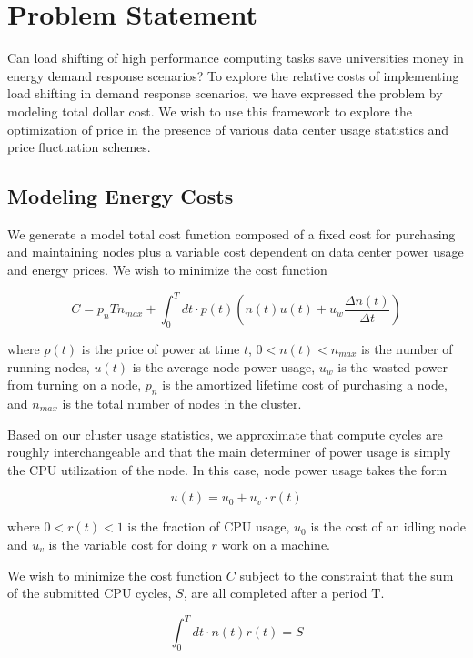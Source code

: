 \documentclass[letterpaper,twocolumn,10pt]{article}
\begin{document}
\section{Problem Statement}

Can load shifting of high performance computing tasks save universities money in energy demand response scenarios?  To explore the relative costs of implementing load shifting in demand response scenarios, we have expressed the problem by modeling total dollar cost.  We wish to use this framework to explore the optimization of price in the presence of various data center usage statistics and price fluctuation schemes.

\subsection{Modeling Energy Costs}

We generate a model total cost function composed of a fixed cost for purchasing and maintaining nodes plus a variable cost dependent on data center power usage and energy prices.  We wish to minimize the cost function

$$C = p_n T n_{max} + \int_0^T dt \cdot p(t)\left (n(t)u(t)+ u_w \frac{\Delta n(t) }{\Delta t} \right )  $$

where $p(t)$ is the price of power at time $t$, $0<n(t)<n_{max}$ is the number of running nodes, $u(t)$ is the average node power usage, $u_w$ is the wasted power from turning on a node, $p_n$ is the amortized lifetime cost of purchasing a node, and $n_{max}$ is the total number of nodes in the cluster.  

Based on our cluster usage statistics, we approximate that compute cycles are roughly interchangeable and that the main determiner of power usage is simply the CPU utilization of the node. In this case, node power usage takes the form

$$u(t) = u_0 + u_v \cdot r(t)$$

where $0<r(t)<1$ is the fraction of CPU usage, $u_0$ is the cost of an idling node and $u_v$ is the variable cost for doing $r$ work on a machine.

We wish to minimize the cost function $C$ subject to the constraint that the sum of the submitted CPU cycles, $S$, are all completed after a period T.

$$\int_0^T dt \cdot n(t)r(t) = S$$
\end{document}
